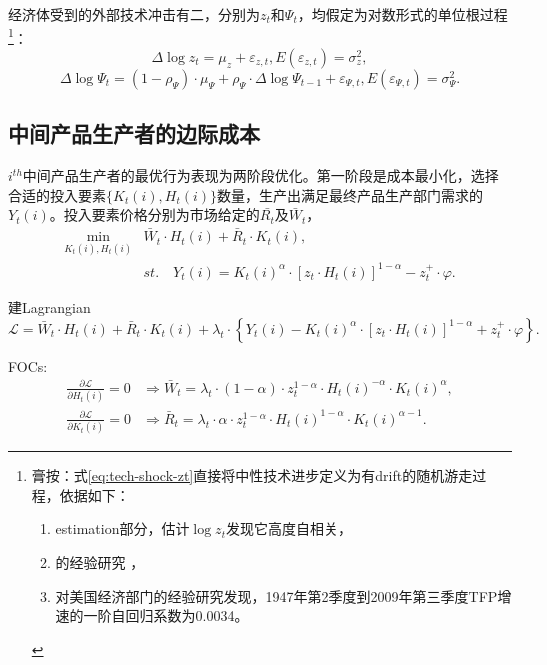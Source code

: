 经济体受到的外部技术冲击有二，分别为$z_t$和$\Psi_t$，均假定为对数形式的单位根过程\footnote{膏按：式\eqref{eq:tech-shock-zt}直接将中性技术进步定义为有drift的随机游走过程，依据如下：
  \begin{enumerate}
  \item estimation部分，\cite{Smets:2003ik}估计$\log z_t$发现它高度自相关，
  \item \cite{Prescott:1986ej}的经验研究 ，
  \item \cite{Fernald2009}对美国经济部门的经验研究发现，1947年第2季度到2009年第三季度TFP增速的一阶自回归系数为0.0034。
  \end{enumerate}
}：
\begin{equation}
  \label{eq:tech-shock-zt}
  \Delta \log z_t = \mu_z + \varepsilon_{z,t}, E(\varepsilon_{z,t}) = \sigma^2_{z},
\end{equation}
\begin{equation}
  \label{eq:tech-shock-Psi}
  \Delta \log \Psi_t = (1-\rho_{\Psi}) \cdot \mu_{\Psi} + \rho_{\Psi} \cdot \Delta \log \Psi_{t-1} + \varepsilon_{\Psi, t}, E(\varepsilon_{\Psi,t}) = \sigma^2_{\Psi}.
\end{equation}


\subsection{中间产品生产者的边际成本}
\label{seq:marg-cost-intm-producer}
$i^{th}$中间产品生产者的最优行为表现为两阶段优化。第一阶段是成本最小化，选择合适的投入要素$\{K_{t}(i), H_{t}(i)\}$数量，生产出满足最终产品生产部门需求的$Y_t(i)$。投入要素价格分别为市场给定的$\bar{R_t}$及$\bar{W}_t$，
\begin{align*}
  \min_{K_{t}(i), H_{t}(i)} &\bar{W}_t \cdot H_t(i) + \bar{R}_t \cdot K_{t}(i), \\
  & st. \quad  Y_t(i) = K_t(i)^{\alpha} \cdot \left[ z_t \cdot H_{t}(i) \right]^{1-\alpha}  -  z_t^+ \cdot \varphi.
\end{align*}

建Lagrangian
\begin{equation*}
  \mathcal{L} = \bar{W}_t \cdot H_t(i) + \bar{R}_t \cdot K_{t}(i) +\lambda_t \cdot \left\{Y_t(i) - K_t(i)^{\alpha} \cdot \left[ z_t \cdot H_{t}(i) \right]^{1-\alpha}  +  z_t^+ \cdot \varphi \right\}.
\end{equation*}

FOCs:
\begin{align}
  \label{eq:intm-marg-min-cost-FOC-H}
  \frac{\partial \mathcal{L}}{\partial H_{t}(i)} = 0 &\Rightarrow \bar{W}_t = \lambda_t \cdot (1-\alpha) \cdot z_t^{1-\alpha} \cdot H_{t}(i)^{-\alpha} \cdot K_{t}(i)^{\alpha},\\
  \label{eq:intm-marg-min-cost-FOC-K}
\frac{\partial \mathcal{L}}{\partial K_{t}(i)} = 0 &\Rightarrow \bar{R}_t = \lambda_t \cdot \alpha \cdot z_t^{1-\alpha} \cdot H_{t}(i)^{1-\alpha} \cdot K_{t}(i)^{\alpha-1}.
\end{align}

